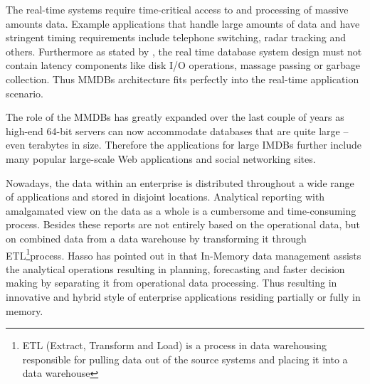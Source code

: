 \documentclass[12pt]{article} %
\begin{document}
The real-time systems require time-critical access to and processing of massive amounts data. Example applications that handle large amounts of data and have stringent timing requirements include telephone switching, radar tracking and others. Furthermore as stated by \cite{ilprints39}, the real time database system design must not contain latency components like disk I/O operations, massage passing or garbage collection. Thus MMDBs architecture fits perfectly into the real-time application scenario. 

The role of the MMDBs has greatly expanded over the last couple of years as high-end 64-bit servers can now accommodate databases that are quite large – even terabytes in size. Therefore the applications for large IMDBs further include many popular large-scale Web applications and social networking sites. 

Nowadays, the data within an enterprise is distributed throughout a wide range of applications and stored in disjoint locations. Analytical reporting with amalgamated view on the data as a whole is a cumbersome and time-consuming process. Besides these reports are not entirely based on the operational data, but on combined data from a data warehouse by transforming it through ETL\footnote{ETL (Extract, Transform and Load) is a process in data warehousing responsible for pulling data out of the source systems and placing it into a data warehouse}process. Hasso has pointed out in \cite{plattner2011memory} that In-Memory data management assists the analytical operations resulting in planning, forecasting and faster decision making by separating it from operational data processing. Thus resulting in innovative and hybrid style of enterprise applications residing partially or fully in memory. 

\end{document}
